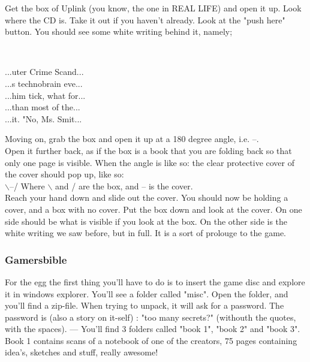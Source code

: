 \documentclass[11pt,twoside,a4paper]{book}
\begin{document}
{Get the box of Uplink (you know, the one in REAL LIFE) and open it up. Look where the CD is. Take it out if you haven't already. Look at the "push here" button. You should see some white writing behind it, namely; ~\\
\begin{minipage}[ht]{1.50cm} ~\\ \end{minipage} \hfill \begin{minipage}[ht]{15.00cm}
	\begin{ttfamily}
		...uter Crime Scand... ~\\
		...s technobrain eve... ~\\
		...him tick, what for... ~\\
		...than most of the... ~\\
		...it. "No, Ms. Smit... ~\\
	\end{ttfamily}
\end{minipage} %

Moving on, grab the box and open it up at a 180 degree angle, i.e. --. ~\\

Open it further back, as if the box is a book that you are folding back so that only one page is visible. When the angle is like so: \/ the clear protective cover of the cover should pop up, like so: ~\\
$\backslash$--/ Where $\backslash$ and / are the box, and -- is the cover. ~\\

Reach your hand down and slide out the cover. You should now be holding a cover, and a box with no cover. Put the box down and look at the cover. On one side should be what is visible if you look at the box. On the other side is the white writing we saw before, but in full. It is a sort of prolouge to the game. %

\subsubsection{Gamersbible}

For the egg the first thing you'll have to do is to insert the game disc and explore it in windows explorer. You'll see a folder called "misc". Open the folder, and you'll find a zip-file. When trying to unpack, it will ask for a password. The password is (also a story on it-self) : "too many secrets?" (withouth the quotes, with the spaces). --- You'll find 3 folders called "book 1", "book 2" and "book 3". Book 1 contains scans of a notebook of one of the creators, 75 pages containing idea's, sketches and stuff, really awesome! ~\\

}
\end{document}
